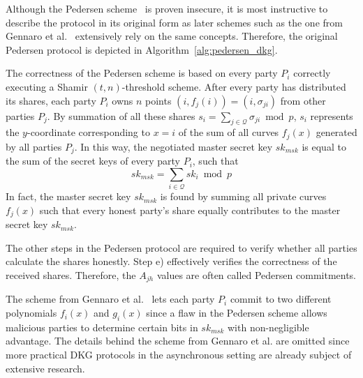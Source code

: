 Although the Pedersen scheme~\cite{art:Pedersen91a} is proven insecure, it is most instructive to describe the protocol in its original form as later schemes such as the one from Gennaro et al.~\cite{art:GennaroJKR07} extensively rely on the same concepts. Therefore, the original Pedersen protocol is depicted in Algorithm~\ref{alg:pedersen_dkg}. 

The correctness of the Pedersen scheme is based on every party $P_i$ correctly executing a Shamir $\left( t, n \right)$-threshold scheme. After every party has distributed its shares, each party $P_i$ owns $n$ points $\left( i, f_j \left( i \right) \right) = \left( i, \sigma_{ji} \right)$ from other parties $P_j$. By summation of all these shares $s_i = \sum_{j \in \mathcal{Q}} \sigma_{ji} \bmod p$, $s_i$ represents the $y$-coordinate corresponding to $x=i$ of the sum of all curves $f_j \left( x \right)$ generated by all parties $P_j$. In this way, the negotiated master secret key $sk_{msk}$ is equal to the sum of the secret keys of every party $P_i$, such that
 \begin{equation*}
  sk_{msk} = \sum_{i \in \mathcal{Q}} sk_i \bmod p
 \end{equation*}
In fact, the master secret key $sk_{msk}$ is found by summing all private curves $f_j \left( x \right)$ such that every honest party's share equally contributes to the master secret key $sk_{msk}$.

The other steps in the Pedersen protocol are required to verify whether all parties calculate the shares honestly. Step e) effectively verifies the correctness of the received shares. Therefore, the $A_{jh}$ values are often called Pedersen commitments. 

The scheme from Gennaro et al.~\cite{art:GennaroJKR07} lets each party $P_i$ commit to two different polynomials $f_i \left( x \right)$ and $g_i \left( x \right)$ since a flaw in the Pedersen scheme allows malicious parties to determine certain bits in $sk_{msk}$ with non-negligible advantage. The details behind the scheme from Gennaro et al. are omitted since more practical DKG protocols in the asynchronous setting are already subject of extensive research.

